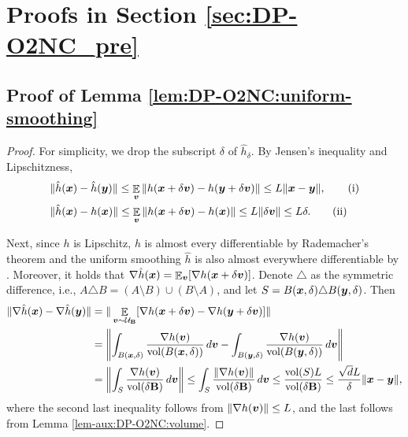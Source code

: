 \section{Proofs in Section \ref{sec:DP-O2NC_pre}}
\label{app:DP-O2NC:pre}

\subsection{Proof of Lemma \ref{lem:DP-O2NC:uniform-smoothing}}
\label{app:DP-O2NC:uniform-smoothing}


\begin{proof}
For simplicity, we drop the subscript $\delta$ of $\hat h_\delta$. By Jensen's inequality and Lipschitzness,
\begin{align*}
    &\|\hat h({\boldsymbol{x}}) - \hat h({\boldsymbol{y}})\| \le \mathop{\mathbb{E}}_{\boldsymbol{v}}\|h({\boldsymbol{x}}+\delta{\boldsymbol{v}}) - h({\boldsymbol{y}}+\delta{\boldsymbol{v}})\| \le L\|{\boldsymbol{x}}-{\boldsymbol{y}}\|, \tag{i} \\
    &\|\hat h({\boldsymbol{x}}) - h({\boldsymbol{x}})\| \le \mathop{\mathbb{E}}_{\boldsymbol{v}}\|h({\boldsymbol{x}}+\delta{\boldsymbol{v}})-h({\boldsymbol{x}})\| \le L\|\delta{\boldsymbol{v}}\| \le L\delta. \tag{ii}
\end{align*}

Next, since $h$ is Lipschitz, $h$ is almost every differentiable by Rademacher's theorem and the uniform smoothing $\hat h$ is also almost everywhere differentiable by \citep[Proposition 2.4]{bertsekas1973stochastic}. Moreover, it holds that $\nabla\hat h({\boldsymbol{x}}) = \mathop{\mathbb{E}}_{\boldsymbol{v}}[\nabla h({\boldsymbol{x}}+\delta{\boldsymbol{v}})]$.
Denote $\triangle$ as the symmetric difference, i.e., 
$A\triangle B = (A\setminus B)\cup (B\setminus A)$, and let 
$S = B({\boldsymbol{x}},\delta)\triangle B({\boldsymbol{y}},\delta)$. Then
\begin{align*}
    \|\nabla\hat h({\boldsymbol{x}}) - \nabla\hat h({\boldsymbol{y}})\|
    &= \|\mathop{\mathbb{E}}_{{\boldsymbol{v}}\sim{\cal U}_{\mathbf{B}}}[ \nabla h({\boldsymbol{x}}+\delta{\boldsymbol{v}}) - \nabla h({\boldsymbol{y}}+\delta{\boldsymbol{v}}) ]\| \\
    &= \left\| \int_{B({\boldsymbol{x}},\delta)} \frac{\nabla h({\boldsymbol{v}})}{\operatorname{vol}(B({\boldsymbol{x}},\delta))} \, d{\boldsymbol{v}} - \int_{B({\boldsymbol{y}},\delta)} \frac{\nabla h({\boldsymbol{v}})}{\operatorname{vol}(B({\boldsymbol{y}},\delta))} \, d{\boldsymbol{v}} \right\| \\
    &= \left\| \int_S
    \frac{\nabla h({\boldsymbol{v}})}{\operatorname{vol}(\delta{\mathbf{B}})} \, d{\boldsymbol{v}} \right\|
    \le \int_S \frac{\|\nabla h({\boldsymbol{v}})\|}{\operatorname{vol}(\delta{\mathbf{B}})} \, d{\boldsymbol{v}}
    \le \frac{\operatorname{vol}(S)L}{\operatorname{vol}(\delta{\mathbf{B}})}
    \le \frac{\sqrt{d}L}{\delta}\|{\boldsymbol{x}}-{\boldsymbol{y}}\|,
\end{align*}
where the second last inequality follows from $\|\nabla h({\boldsymbol{v}})\| \le L$, and the last follows from Lemma \ref{lem-aux:DP-O2NC:volume}. 


\end{proof}
